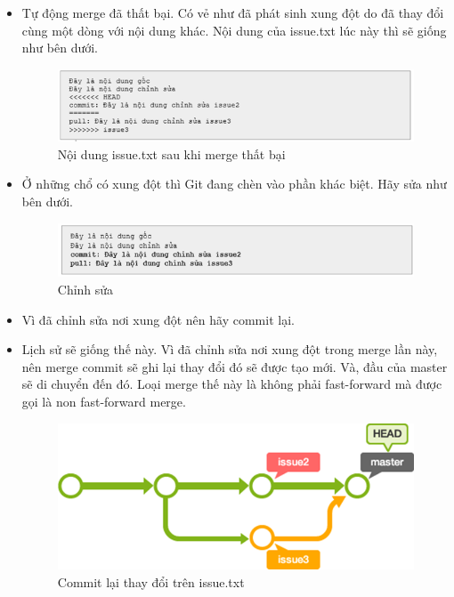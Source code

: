 \documentclass[12pt,a4paper]{report}
\begin{document}
\begin{itemize}
\item Tự động merge đã thất bại. Có vẻ như đã phát sinh xung đột do đã thay đổi cùng một dòng với nội dung khác. Nội dung của issue.txt lúc này thì sẽ giống như bên dưới.

\begin{figure}[!ht]
	\centering
	\includegraphics[width=0.8\linewidth]{screenshot05}
\caption{Nội dung issue.txt sau khi merge thất bại}
	\label{fig:screenshot05}	
\end{figure}

\item Ở những chổ có xung đột thì Git đang chèn vào phần khác biệt. Hãy sửa như bên dưới.	

\begin{figure}[!ht]
	\centering
	\includegraphics[width=0.8\linewidth]{screenshot06}
\caption{Chỉnh sửa}
	\label{fig:screenshot06}	
\end{figure}

\item Vì đã chỉnh sửa nơi xung đột nên hãy commit lại.
\item Lịch sử sẽ giống thế này. Vì đã chỉnh sửa nơi xung đột trong merge lần này, nên merge commit sẽ ghi lại thay đổi đó sẽ được tạo mới. Và, đầu của master sẽ di chuyển đến đó. Loại merge thế này là không phải fast-forward mà được gọi là non fast-forward merge.

\begin{figure}[!ht]
	\centering
	\includegraphics[width=0.8\linewidth]{screenshot064}
\caption{Commit lại thay đổi trên issue.txt}
	\label{fig:screenshot064}
	\end{figure}
\end{itemize}
\end{document}
